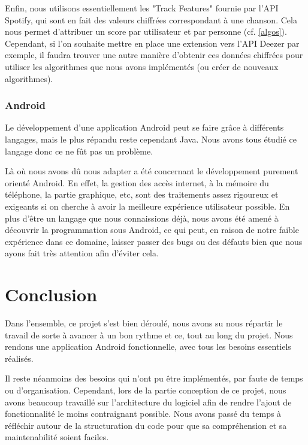 \documentclass{article}
\begin{document}
		Enfin, nous utilisons essentiellement les "Track Features" fournie par l'API Spotify, qui sont en fait des valeurs chiffrées correspondant à une chanson. Cela nous permet d'attribuer un score par utilisateur et par personne (cf. \ref{algos}). Cependant, si l'on souhaite mettre en place une extension vers l'API Deezer par exemple, il faudra trouver une autre manière d'obtenir ces données chiffrées pour utiliser les algorithmes que nous avons implémentés (ou créer de nouveaux algorithmes).
		\subsubsection{Android}
		Le développement d'une application Android peut se faire grâce à différents langages, mais le plus répandu reste cependant Java. Nous avons tous étudié ce langage donc ce ne fût pas un problème.
		
		Là où nous avons dû nous adapter a été concernant le développement purement orienté Android. En effet, la gestion des accès internet, à la mémoire du téléphone, la partie graphique, etc, sont des traitements assez rigoureux et exigeants si on cherche à avoir la meilleure expérience utilisateur possible. En plus d'être un langage que nous connaissions déjà, nous avons été amené à découvrir la programmation sous Android, ce qui peut, en raison de notre faible expérience dans ce domaine, laisser passer des bugs ou des défauts bien que nous ayons fait très attention afin d'éviter cela.

		\section{Conclusion}
        Dans l'ensemble, ce projet s'est bien déroulé, nous avons su nous répartir le travail de sorte à avancer à un bon rythme et ce, tout au long du projet. Nous  rendons une application Android fonctionnelle, avec tous les besoins essentiels réalisés.
        
        Il reste néanmoins des besoins qui n'ont pu être implémentés, par faute de temps ou d'organisation. Cependant, lors de la partie conception de ce projet, nous avons beaucoup travaillé sur l'architecture du logiciel afin de rendre l'ajout de fonctionnalité le moins contraignant possible. Nous avons passé du temps à réfléchir autour de la structuration du code pour que sa compréhension et sa maintenabilité soient faciles.
        
\end{document}
